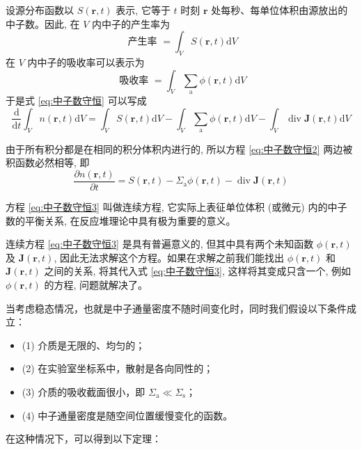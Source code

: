 \documentclass{Sichuan Normal University}
\begin{document}
设源分布函数以 $S(\boldsymbol{r}, t)$ 表示, 它等于 $t$ 时刻 $\boldsymbol{r}$ 处每秒、每单位体积由源放出的中子数。因此, 在 $V$ 内中子的产生率为
\begin{equation}
    \text { 产生率 }=\int_V S(\boldsymbol{r}, t) \mathrm{d} V
    \label{eq:产生率}
\end{equation}
在 $V$ 内中子的吸收率可以表示为
\begin{equation}
    \text { 吸收率 }=\int_V \sum_{\mathrm{a}} \phi(\boldsymbol{r}, t) \mathrm{d} V
    \label{eq:吸收率}
\end{equation}
于是式 \eqref{eq:中子数守恒} 可以写成
\begin{equation}
    \frac{\mathrm{d}}{\mathrm{d} t} \int_V n(\boldsymbol{r}, t) \mathrm{d} V=\int_V S(\boldsymbol{r}, t) \mathrm{d} V-\int_V \sum_{\mathrm{a}} \phi(\boldsymbol{r}, t) \mathrm{d} V-\int_V \operatorname{div} \boldsymbol{J}(\boldsymbol{r}, t) \mathrm{d} V
    \label{eq:中子数守恒2}
\end{equation}

由于所有积分都是在相同的积分体积内进行的, 所以方程 \eqref{eq:中子数守恒2} 两边被积函数必然相等, 即
\begin{equation}
    \frac{\partial n(\boldsymbol{r}, t)}{\partial t}=S(\boldsymbol{r}, t)-\Sigma_{\mathrm{a}} \phi(\boldsymbol{r}, t)-\operatorname{div} \boldsymbol{J}(\boldsymbol{r}, t)
    \label{eq:中子数守恒3}
\end{equation}

方程 \eqref{eq:中子数守恒3} 叫做连续方程, 它实际上表征单位体积 (或微元) 内的中子数的平衡关系, 在反应堆理论中具有极为重要的意义。

连续方程 \eqref{eq:中子数守恒3} 是具有普遍意义的, 但其中具有两个未知函数 $\phi(\boldsymbol{r}, t)$ 及 $\boldsymbol{J}(\boldsymbol{r}, t)$, 
因此无法求解这个方程。如果在求解之前我们能找出 $\phi(\boldsymbol{r}, t)$ 和 $\boldsymbol{J}(\boldsymbol{r}, t)$ 之间的关系, 将其代入式 \eqref{eq:中子数守恒3}, 这样将其变成只含一个, 例如 $\phi(\boldsymbol{r}, t)$ 的方程, 问题就解决了。

当考虑稳态情况，也就是中子通量密度不随时间变化时，同时我们假设以下条件成立：
    \begin{itemize}
        \item[] \hspace{1em}(1) 介质是无限的、均匀的；
        \item[] \hspace{1em}(2) 在实验室坐标系中，散射是各向同性的；
        \item[] \hspace{1em}(3) 介质的吸收截面很小，即 $\Sigma_{\mathrm{a}} \ll \Sigma_{\mathrm{s}}$；
        \item[] \hspace{1em}(4) 中子通量密度是随空间位置缓慢变化的函数。
    \end{itemize}
在这种情况下，可以得到以下定理：
\end{document}
